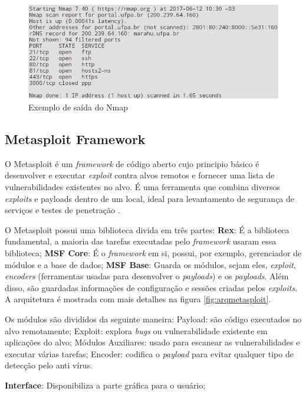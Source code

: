 \documentclass[
	12pt,				
	openright,		
	twoside,	
	a4paper,
	english,	
	brazil	
	]{abntex2}
\begin{document}
\begin{figure}[!htp]
 \centering
 \includegraphics[scale=.5]{nmap.png}
 \caption{Exemplo de saída do Nmap}
 \label{fig:nmap}
\end{figure}

\subsection{Metasploit Framework} \label{sec:metasploit}

O Metasploit é um \textit{framework} de código aberto cujo principio básico é desenvolver e executar \textit{exploit} contra alvos remotos e fornecer uma lista de vulnerabilidades existentes no alvo. É uma ferramenta que combina diversos \textit{exploits} e payloads dentro de um local, ideal para levantamento de segurança de serviços e testes de penetração \cite{metasploit:yash}.  

O Metasploit possui uma biblioteca divida em três partes: \textbf{Rex}: É a biblioteca fundamental, a maioria das tarefas executadas pelo \textit{framework} usaram essa biblioteca; \textbf{MSF Core}: É o \textit{framework} em si, possui, por exemplo, gerenciador de módulos e a base de dados; \textbf{MSF Base}: Guarda os módulos, sejam eles, \textit{exploit}, \textit{encoders} (ferramentas usadas para desenvolver o \textit{payloads}) e os \textit{payloads}. Além disso, são guardadas informações de configuração e sessões criadas pelos \textit{exploits}. A arquitetura é mostrada com mais detalhes na figura \ref{fig:arqmetasploit}. 

Os módulos são divididos da seguinte maneira: Payload: são código executados no alvo remotamente; Exploit: explora \textit{bugs} ou vulnerabilidade existente em aplicações do alvo; Módulos Auxiliares: usado para escanear as vulnerabilidades e executar várias tarefas; Encoder: codifica o \textit{payload} para evitar qualquer tipo de detecção pelo anti vírus.

\textbf{Interface}: Disponibiliza a parte gráfica para o usuário;
\end{document}
